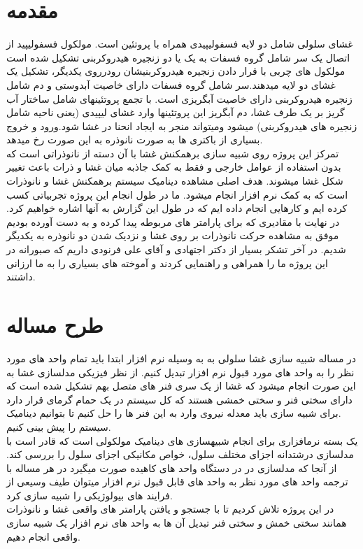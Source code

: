 \documentclass[12pt,onecolumn,a4paper]{report}
\begin{document}
\section{\LARGE{مقدمه} }
{\large{غشای سلولی شامل دو لایه فسفولیپیدی همراه با پروتئین است. مولکول فسفولیپید از اتصال یک سر شامل گروه فسفات
به یک یا دو زنجیره هیدروکربنی تشکیل شده است
مولکول های چربی با قرار دادن زنجیره هیدروکربنیشان
رودرروی یکدیگر، تشکیل یک غشای دو لایه میدهند.سر شامل گروه فسفات دارای خاصیت آبدوستی و دم شامل زنجیره هیدروکربنی دارای خاصیت
آبگریزی است. با تجمع پروتئینهای شامل ساختار
آب گریز بر یک طرف غشا، دم آبگریز این پروتئینها وارد غشای لیپیدی (یعنی ناحیه
شامل زنجیره های هیدروکربنی) میشود ومیتواند منجر به ایجاد
انحنا در غشا شود.ورود و خروج بسیاری از باکتری ها به صورت نانوذره به این صورت رخ میدهد.\\
تمرکز این پروژه روی شبیه سازی برهمکنش غشا با آن دسته از نانوذراتی است که بدون استفاده از عوامل خارجی و فقط به کمک جاذبه میان غشا و ذرات باعث تغییر شکل غشا میشوند.
هدف اصلی مشاهده دینامیک سیستم برهمکنش غشا و نانوذرات است که به کمک نرم افزار  انجام میشود.
ما در طول انجام این پروژه تجربیاتی کسب کرده ایم و کارهایی انجام داده ایم که در طول این گزارش به آنها اشاره خواهیم کرد. در نهایت با مقادیری که برای پارامتر های مربوطه پیدا کرده و به دست آورده بودیم موفق به مشاهده حرکت نانوذرات بر روی غشا و نزدیک شدن دو نانوذره به یکدیگر شدیم.
در آخر تشکر بسیار از دکتر اجتهادی و آقای علی فرنودی داریم که صبورانه در این پروژه ما را همراهی و راهنمایی کردند و آموخته های بسیاری را به ما ارزانی داشتند.}




\section{\LARGE{طرح مساله}}
در مساله شبیه سازی غشا سلولی به به وسیله نرم افزار ابتدا باید تمام واحد های مورد نظر را به واحد های مورد قبول نرم افزار تبدیل کنیم. از نظر فیزیکی مدلسازی غشا به این صورت انجام میشود که غشا از یک سری فنر های متصل  بهم تشکیل شده است که دارای سختی فنر و سختی خمشی هستند که کل سیستم در یک حمام گرمای قرار دارد .برای شبیه سازی باید معدله نیروی وارد به این فنر ها را حل کنیم تا بتوانیم دینامیک سیستم را پیش بینی کنیم.\\

 یک بسته نرمافزاری برای انجام شبیهسازی های دینامیک مولکولی است که قادر است
با مدلسازی درشتدانه اجزای مختلف سلول، خواص مکانیکی اجزای سلول را بررسی کند.
از آنجا که مدلسازی در در دستگاه واحد های کاهیده صورت میگیرد در هر مساله با ترجمه واحد های مورد نظر به واحد های قابل قبول نرم افزار میتوان طیف وسیعی از فرایند های بیولوژیکی را شبیه سازی کرد.\\
در این پروژه تلاش کردیم تا با جستجو و یافتن پارامتر های واقعی غشا و نانوذرات همانند سختی خمش و سختی فنر  تبدیل آن ها به واحد های نرم افزار یک شبیه سازی واقعی انجام دهیم.




}
\end{document}
